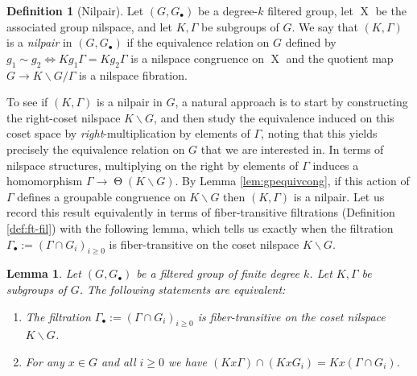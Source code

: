 \documentclass[a4paper,12pt,reqno]{amsart}
\newtheorem{lemma}[theorem]{Lemma}
\theoremstyle{definition}
\newtheorem{defn}[theorem]{Definition}
\def\to{\rightarrow}
\DeclareMathOperator{\tran}{\Theta}
\DeclareMathOperator{\ns}{X}
\begin{document}
\begin{defn}[Nilpair] 
Let $(G,G_\bullet)$ be a degree-$k$ filtered group, let $\ns$ be the associated group nilspace, and let  $K,\Gamma$ be subgroups of $G$. We say that $(K,\Gamma)$ is a \emph{nilpair}  in $(G,G_\bullet)$ if the equivalence relation on $G$ defined by $g_1\sim g_2 \iff Kg_1\Gamma=Kg_2\Gamma$ is a nilspace congruence on $\ns$ and the quotient map $G\to K\backslash G /\Gamma$ is a nilspace fibration. 
\end{defn}
\noindent To see if $(K,\Gamma)$ is a nilpair in $G$, a natural approach is to start by constructing the right-coset nilspace $K\backslash G$, and then study the equivalence induced on this coset space by \emph{right}-multiplication by elements of $\Gamma$, noting that this yields precisely the equivalence relation on $G$ that we are interested in. In terms of nilspace structures, multiplying on the right by elements of $\Gamma$ induces a  homomorphism $\Gamma\to \tran(K\backslash G)$. By Lemma \ref{lem:gpequivcong}, if this action of $\Gamma$ defines a groupable congruence on $K\backslash G$ then  $(K,\Gamma)$ is a nilpair. Let us record this result equivalently in terms of fiber-transitive filtrations (Definition \ref{def:ft-fil}) with the following lemma, which tells us exactly when the filtration $\Gamma_\bullet:=(\Gamma\cap G_i)_{i\ge 0}$ is fiber-transitive on the coset nilspace $K\backslash G$.
\begin{lemma}\label{lem:nil-pair-good-fil}
Let $(G,G_\bullet)$ be a filtered group of finite degree $k$. Let $K,\Gamma$ be subgroups of $G$. The following statements are equivalent:
\begin{enumerate}[leftmargin=0.7cm]
    \item The filtration $\Gamma_\bullet:=(\Gamma\cap G_i)_{i\ge 0}$ is fiber-transitive on the coset nilspace $K\backslash G$.
    \item For any $x\in G$ and all $i\ge 0$ we have $(Kx\Gamma)\cap(KxG_i)=Kx(\Gamma\cap G_i)$.
\end{enumerate}
\end{lemma}
\end{document}
